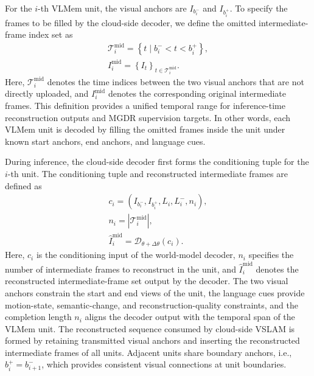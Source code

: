 \documentclass[journal]{IEEEtran}
\begin{document}
For the \(i\)-th VLMem unit, the visual anchors are \(I_{b_i^-}\) and \(I_{b_i^+}\). To specify the frames to be filled by the cloud-side decoder, we define the omitted intermediate-frame index set as
\begin{equation}
\begin{gathered}
\mathcal{T}_i^{\mathrm{mid}}=
\left\{
t\mid b_i^-<t<b_i^+
\right\},\\
I_i^{\mathrm{mid}}=
\left\{
I_t
\right\}_{t\in\mathcal{T}_i^{\mathrm{mid}}}.
\end{gathered}
\label{eq:mid_interval}
\end{equation}
Here, \(\mathcal{T}_i^{\mathrm{mid}}\) denotes the time indices between the two visual anchors that are not directly uploaded, and \(I_i^{\mathrm{mid}}\) denotes the corresponding original intermediate frames. This definition provides a unified temporal range for inference-time reconstruction outputs and MGDR supervision targets. In other words, each VLMem unit is decoded by filling the omitted frames inside the unit under known start anchors, end anchors, and language cues.

During inference, the cloud-side decoder first forms the conditioning tuple for the \(i\)-th unit. The conditioning tuple and reconstructed intermediate frames are defined as
\begin{equation}
\begin{gathered}
c_i=
\left(
I_{b_i^-},
I_{b_i^+},
L_i,
L_i^-,
n_i
\right),\\
n_i=
\left|
\mathcal{T}_i^{\mathrm{mid}}
\right|,\\
\hat{I}_i^{\mathrm{mid}}=
\mathcal{D}_{\theta+\Delta\theta}(c_i).
\end{gathered}
\label{eq:conditional_reconstruction}
\end{equation}
Here, \(c_i\) is the conditioning input of the world-model decoder, \(n_i\) specifies the number of intermediate frames to reconstruct in the unit, and \(\hat{I}_i^{\mathrm{mid}}\) denotes the reconstructed intermediate-frame set output by the decoder. The two visual anchors constrain the start and end views of the unit, the language cues provide motion-state, semantic-change, and reconstruction-quality constraints, and the completion length \(n_i\) aligns the decoder output with the temporal span of the VLMem unit. The reconstructed sequence consumed by cloud-side VSLAM is formed by retaining transmitted visual anchors and inserting the reconstructed intermediate frames of all units. Adjacent units share boundary anchors, i.e., \(b_i^+=b_{i+1}^-\), which provides consistent visual connections at unit boundaries.
\end{document}
